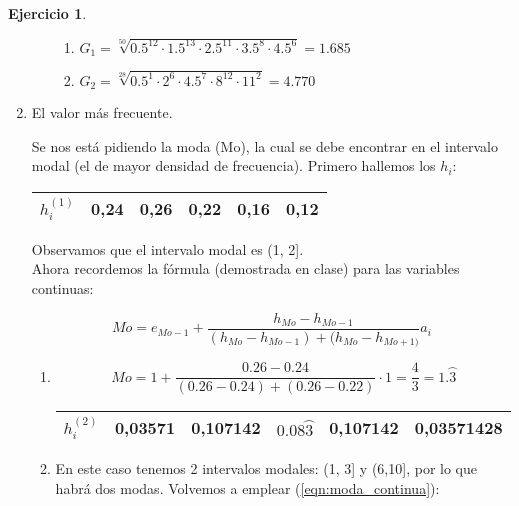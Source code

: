 \documentclass[a4paper, 12pt]{article}
\theoremstyle{definition}
\newtheorem{ej}{Ejercicio}
\begin{document}
\begin{ej}
\begin{enumerate}[label=\textit{\alph*)}]
\begin{enumerate}[label=]
        \begin{enumerate}[label=(\arabic*)]
            \item \(G_1 = \sqrt[50]{0.5^{12} \cdot 1.5^{13} \cdot 2.5^{11} \cdot 3.5^8 \cdot 4.5^6} = 1.685\)
            
            \item \(G_2 = \sqrt[28]{0.5^1 \cdot 2^6 \cdot 4.5^7 \cdot 8^{12} \cdot 11^2} = 4.770\)
        \end{enumerate}
    \end{enumerate}
    
    \item El valor más frecuente.
    
    Se nos está pidiendo la moda (Mo), la cual se debe encontrar en el intervalo modal (el de mayor densidad de frecuencia). Primero hallemos los \(h_i\):
    \begin{center}
        \begin{tabular}{|c|c|c|c|c|c|}
        \hline
             \(h_i^{(1)}\) & 0,24 & 0,26 & 0,22 & 0,16 & 0,12 \\
        \hline
        \end{tabular}
    \end{center}
    
    Observamos que el intervalo modal es (1, 2]. \\
    Ahora recordemos la fórmula (demostrada en clase) para las variables continuas:
    
    \begin{equation}\label{eqn:moda_continua}
        Mo = e_{Mo-1} + \frac{h_{Mo} - h_{Mo-1}}{(h_{Mo} - h_{Mo-1}) + (h_{Mo} - h_{Mo+1)}}a_i
    \end{equation}
    \begin{enumerate}[label=(\arabic*)]
    \item
    \[
    Mo = 1 + \frac{0.26 - 0.24}{(0.26-0.24) + (0.26 - 0.22)} \cdot 1 = \frac{4}{3} = 1.\wideparen{3}
    \]
    
    \begin{center}
        \begin{tabular}{|c|c|c|c|c|c|}
        \hline
             \(h_i^{(2)}\) & 0,03571 & 0,107142 & \(0.08\wideparen{3}\) & 0,107142 & 0,03571428 \\
        \hline
        \end{tabular}
    \end{center}
    \item
    En este caso tenemos 2 intervalos modales: (1, 3] y (6,10], por lo que habrá dos modas. Volvemos a emplear (\ref{eqn:moda_continua}):
    

\end{enumerate}
\end{enumerate}
\end{ej}
\end{document}
